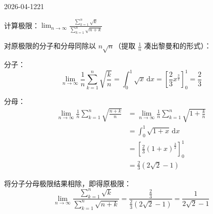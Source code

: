 \begin{mistake}{2026-04-12}{21}

\begin{problemcontent}
计算极限：\(\displaystyle \lim_{n \to \infty} \frac{\sum_{k=1}^{n} \sqrt{k}}{\sum_{k=1}^{n} \sqrt{n+k}}\)
\end{problemcontent}

\begin{solutioncontent}
对原极限的分子和分母同除以 \(n\sqrt{n}\)（提取 \(\frac{1}{n}\) 凑出黎曼和的形式）：

分子：
\[
\lim_{n \to \infty} \frac{1}{n} \sum_{k=1}^{n} \sqrt{\frac{k}{n}} = \int_{0}^{1} \sqrt{x} \,\mathrm{d}x = \left[ \frac{2}{3}x^{\frac{3}{2}} \right]_0^1 = \frac{2}{3}
\]

分母：
\[
\begin{aligned}
\lim_{n \to \infty} \frac{1}{n} \sum_{k=1}^{n} \sqrt{\frac{n+k}{n}} &= \lim_{n \to \infty} \frac{1}{n} \sum_{k=1}^{n} \sqrt{1 + \frac{k}{n}} \\
&= \int_{0}^{1} \sqrt{1+x} \,\mathrm{d}x \\
&= \left[ \frac{2}{3}(1+x)^{\frac{3}{2}} \right]_0^1 \\
&= \frac{2}{3}(2\sqrt{2} - 1)
\end{aligned}
\]

将分子分母极限结果相除，即得原极限：
\[
\lim_{n \to \infty} \frac{\sum_{k=1}^{n} \sqrt{k}}{\sum_{k=1}^{n} \sqrt{n+k}} = \frac{\frac{2}{3}}{\frac{2}{3}(2\sqrt{2} - 1)} = \frac{1}{2\sqrt{2} - 1}
\]
\end{solutioncontent}


\end{mistake}
